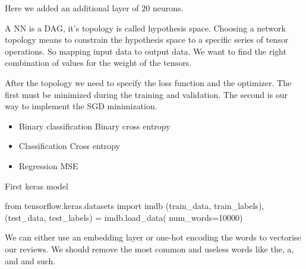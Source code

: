 Here we added an additional layer of 20 neurons.

\vspace{10pt}

A NN is a DAG, it's topology is called hypothesis space. Choosing a network topology means to constrain the hypothesis space to a specific series of tensor operations. So mapping input data to output data. We want to find the right combination of values for the weight of the tensors. 

\vspace{10pt}

After the topology we need to specify the loss function and the optimizer. The first must be minimized during the training and validation. The second is our way to implement the SGD minimization. 

\vspace{10pt}

\begin{itemize}
    \item Binary classification \ra Binary cross entropy
    \item Classification \ra Cross entropy
    \item Regression \ra MSE 
\end{itemize}

\vspace{10pt}

First keras model

\begin{pythoncode}
    from tensorflow.keras.datasets import imdb
    (train_data, train_labels), (test_data, test_labels) = imdb.load_data( num_words=10000)
\end{pythoncode}

We can either use an embedding layer or one-hot encoding the words to vectorise our reviews. We should remove the most common and useless words like the, a, and  and such.




